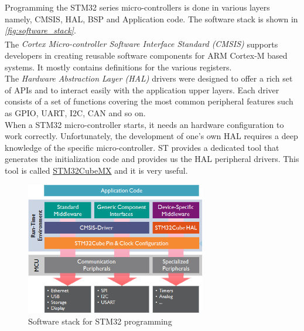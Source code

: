 \documentclass[a4paper,12pt,oneside]{book}
\begin{document}
Programming the STM32 series micro-controllers is done in various layers namely, CMSIS, HAL, BSP and Application code. The software stack is shown in \textit{\autoref{fig:software_stack}}.\\

The \textit{Cortex\textsuperscript{\textregistered} Micro-controller Software Interface Standard (CMSIS)} supports developers in creating reusable software components for ARM Cortex-M based systems. It mostly contains definitions for the various registers.\\

The \textit{Hardware Abstraction Layer (HAL)} drivers were designed to offer a rich set of APIs and to interact easily with the application upper layers. Each driver consists of a set of functions covering the most common peripheral features such as GPIO, UART, I2C, CAN and so on.\cite{stm32hal}\\

When a STM32 micro-controller starts, it needs an hardware configuration to work correctly. Unfortunately, the development of one's own HAL requires a deep knowledge of the specific micro-controller. ST provides a dedicated tool that generates the initialization code and provides us the HAL peripheral drivers. This tool is called \href{http://www.st.com/en/development-tools/stm32cubemx.html}{STM32CubeMX} and it is very useful.\cite{carmine}\\

\begin{figure}[!htb]
\centering
\includegraphics[width=0.7\textwidth]{images/software_stack}
\caption{Software stack for STM32 programming}
\label{fig:software_stack}
\end{figure}
\end{document}
